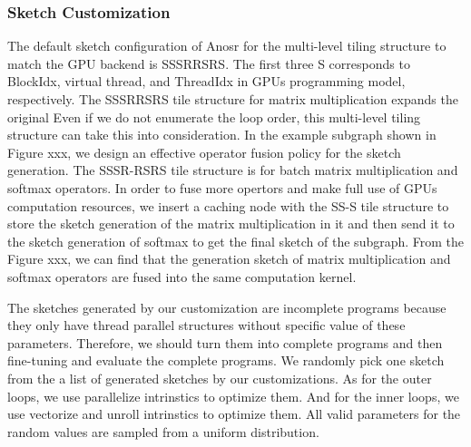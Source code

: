 


\subsubsection{Sketch Customization} 

The default sketch configuration of Anosr for the multi-level tiling structure to match the GPU backend is SSSRRSRS.
The first three S corresponds to BlockIdx, virtual thread, and ThreadIdx in GPUs programming model, respectively.
The SSSRRSRS tile structure for matrix multiplication expands the original %
Even if we do not enumerate the loop order, this multi-level tiling structure can take this into consideration. In the example subgraph shown in Figure xxx, we design an effective
operator fusion policy for the sketch generation. The SSSR-RSRS tile structure is for batch matrix multiplication and softmax operators. In order to fuse more opertors and make 
full use of GPUs computation resources, we insert a caching node with the SS-S tile structure to store the sketch generation of the matrix multiplication in it and then 
send it to the sketch generation of softmax to get the final sketch of the subgraph. From the Figure xxx, we can find that the generation sketch of matrix multiplication 
and softmax operators are fused into the same computation kernel.




The sketches generated by our customization are incomplete programs because they only have thread parallel structures without specific 
value of these parameters. Therefore, we should turn them into complete programs and then fine-tuning and evaluate the complete programs. 
We randomly pick one sketch from the a list of generated sketches by our customizations. As for the outer loops, we use parallelize intrinstics to optimize them. And for the inner loops, we use vectorize and unroll intrinstics to optimize them.
All valid parameters for the random values are sampled from a uniform distribution.



